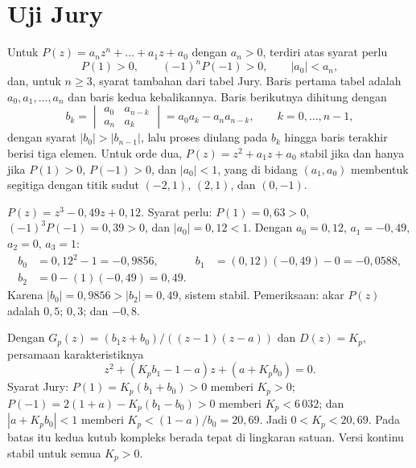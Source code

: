 \section{Uji Jury}
Untuk $P(z) = a_nz^n + \dots + a_1z + a_0$ dengan $a_n > 0$,  terdiri atas syarat perlu
\begin{equation}
	P(1) > 0,\qquad (-1)^nP(-1) > 0,\qquad |a_0| < a_n,
\end{equation}
dan, untuk $n \ge 3$, syarat tambahan dari tabel Jury. Baris pertama tabel adalah $a_0, a_1, \dots, a_n$ dan baris kedua kebalikannya. Baris berikutnya dihitung dengan
\begin{equation}
	b_k = \begin{vmatrix}a_0 & a_{n-k}\\ a_n & a_k\end{vmatrix} = a_0a_k - a_na_{n-k},\qquad k = 0, \dots, n-1,
\end{equation}
dengan syarat $|b_0| > |b_{n-1}|$, lalu proses diulang pada $b_k$ hingga baris terakhir berisi tiga elemen. Untuk orde dua, $P(z) = z^2 + a_1z + a_0$ stabil jika dan hanya jika $P(1) > 0$, $P(-1) > 0$, dan $|a_0| < 1$, yang di bidang $(a_1, a_0)$ membentuk segitiga dengan titik sudut $(-2,1)$, $(2,1)$, dan $(0,-1)$.

\begin{contoh}
	$P(z) = z^3 - 0{,}49z + 0{,}12$. Syarat perlu: $P(1) = 0{,}63 > 0$, $(-1)^3P(-1) = 0{,}39 > 0$, dan $|a_0| = 0{,}12 < 1$. Dengan $a_0 = 0{,}12$, $a_1 = -0{,}49$, $a_2 = 0$, $a_3 = 1$:
	\begin{align*}
		b_0 &= 0{,}12^2 - 1 = -0{,}9856, & b_1 &= (0{,}12)(-0{,}49) - 0 = -0{,}0588,\\
		b_2 &= 0 - (1)(-0{,}49) = 0{,}49. &&
	\end{align*}
	Karena $|b_0| = 0{,}9856 > |b_2| = 0{,}49$, sistem stabil. Pemeriksaan: akar $P(z)$ adalah $0{,}5$; $0{,}3$; dan $-0{,}8$.
\end{contoh}

\begin{contoh}
	Dengan $G_p(z) = (b_1z+b_0)/((z-1)(z-a))$ dan $D(z) = K_p$, persamaan karakteristiknya
	\[
		z^2 + (K_pb_1 - 1 - a)z + (a + K_pb_0) = 0.
	\]
	Syarat Jury: $P(1) = K_p(b_1+b_0) > 0$ memberi $K_p > 0$; $P(-1) = 2(1+a) - K_p(b_1-b_0) > 0$ memberi $K_p < 6\,032$; dan $|a + K_pb_0| < 1$ memberi $K_p < (1-a)/b_0 = 20{,}69$. Jadi $0 < K_p < 20{,}69$. Pada batas itu kedua kutub kompleks berada tepat di lingkaran satuan. Versi kontinu stabil untuk semua $K_p > 0$.
\end{contoh}

